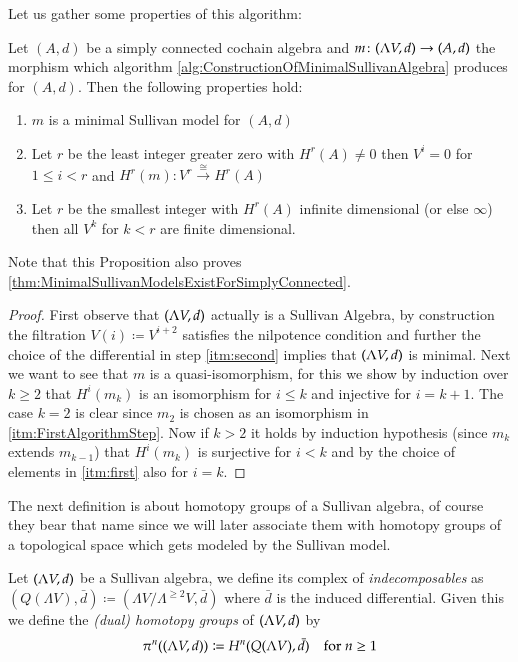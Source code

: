 Let us gather some properties of this algorithm:
\begin{Proposition}
 Let $(A,d)$ be a simply connected cochain algebra and $m \colon (\Lambda V,d) \to (A,d)$ the morphism which
 algorithm \ref{alg:ConstructionOfMinimalSullivanAlgebra} produces for $(A,d)$. Then the following properties hold:
 \begin{enumerate}
  \item $m$ is a minimal Sullivan model for $(A,d)$
  \item Let $r$ be the least integer greater zero with $H^r(A) \neq 0$ then $V^i = 0$ for $1 \leq i < r$ and
    $H^r(m) \colon V^r \overset{\cong}{\to} H^r(A)$
  \item Let $r$ be the smallest integer with $H^r(A)$ infinite dimensional (or else $\infty$) then
    all $V^k$ for $k < r$ are finite dimensional.
 \end{enumerate}

\end{Proposition}
Note that this Proposition also proves \ref{thm:MinimalSullivanModelsExistForSimplyConnected}.
\begin{proof}
 First observe that $(\Lambda V,d)$ actually is a Sullivan Algebra, by construction the filtration $V(i) \coloneqq V^{i+2}$ satisfies
 the nilpotence condition and further the choice of the differential in step \ref{itm:second} implies that $(\Lambda V,d)$ is minimal.
 Next we want to see that $m$ is a quasi-isomorphism, for this we show by induction over $k \geq 2$ that
 $H^i(m_k)$ is an isomorphism for $i \leq k$ and injective for $ i = k +1$. The case $k = 2$ is clear since $m_2$ is chosen
 as an isomorphism in \ref{itm:FirstAlgorithmStep}. Now if $k > 2$ it holds by induction hypothesis (since $m_k$ extends
 $m_{k-1}$) that $H^i(m_k)$ is surjective for $i < k$ and by the choice of elements in \ref{itm:first} also for $i = k$.
 
 
\end{proof}

The next definition is about homotopy groups of a Sullivan algebra, of course they bear that name since we will later
associate them with homotopy groups of a topological space which gets modeled by the Sullivan model.

\begin{Definition}
 Let $(\Lambda V,d)$ be a Sullivan algebra, we define its complex of \emph{indecomposables} as
 $(Q(\Lambda V),\bar{d}) \coloneqq (\Lambda V / \Lambda^{\geq 2} V , \bar{d})$ where $\bar{d}$ is the induced differential.
 Given this we define the \emph{(dual) homotopy groups} of $(\Lambda V,d)$ by 
 $$ \pi^n ( (\Lambda V,d)) \coloneqq H^n(Q(\Lambda V),\bar{d}) \quad \text{for $n \geq 1$}$$
\end{Definition}

